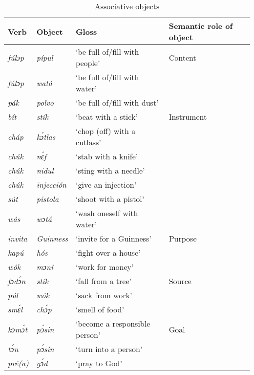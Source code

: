 \begin{table}[t]
\caption{Associative objects}
\label{tab:key:9.9}

\begin{tabularx}{\textwidth}{llXl}
\lsptoprule

Verb & Object & Gloss & Semantic role of object\\
\midrule
\itshape fúlɔp & \itshape pípul & ‘be full of/fill with people’ & Content\\
\itshape fúlɔp & \itshape watá & ‘be full of/fill with water’ & \\
\itshape pák & \itshape polvo & ‘be full of/fill with dust’ & \\
\itshape bít & \itshape stík & ‘beat with a stick’ & Instrument\\
\itshape cháp & \itshape kɔ́tlas & ‘chop (off) with a cutlass’ & \\
\itshape chúk & \itshape nɛ́f & ‘stab with a knife’ & \\
\itshape chúk & \itshape nidul & ‘sting with a needle’ & \\
\itshape chúk & \itshape injección & ‘give an injection’ & \\
\itshape sút & \itshape pistola & ‘shoot with a pistol’ & \\
\itshape wás & \itshape wɔtá & ‘wash oneself with water’ & \\

\tablevspace
\itshape invita & \itshape Guinness & ‘invite for a Guinness’ & Purpose\\
\itshape kapú & \itshape hós & ‘fight over a house’ & \\
\itshape wók & \itshape mɔní & ‘work for money’ & \\

\tablevspace
\itshape fɔdɔ́n & \itshape stík & ‘fall from a tree’ & Source\\
\itshape púl & \itshape wók & ‘sack from work’ & \\
\itshape smɛ́l & \itshape chɔ́p & ‘smell of food’ & \\

\tablevspace
\itshape kɔmɔ́t & \itshape pɔ́sin & ‘become a responsible person’ & Goal\\
\itshape tɔ́n & \itshape pɔ́sin & ‘turn into a person’ & \\
\itshape pré(a) & \itshape gɔ́d & ‘pray to God’ & \\


\end{tabularx}
\end{table}
